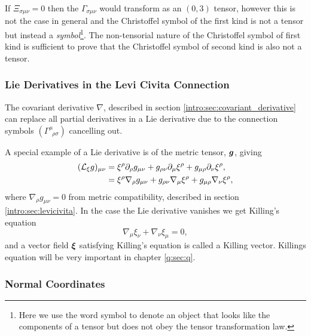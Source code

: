 If $\Xi_{\sigma\mu\nu}=0$ then the $\Gamma_{\sigma\mu\nu}$ would transform as an $(0,3)$ tensor, however this is not the case in general and the Christoffel symbol of the first kind is not a tensor but instead a {\it symbol}\footnote{Here we use the word symbol to denote an object that looks like the components of a tensor but does not obey the tensor transformation law.}. The non-tensorial nature of the Christoffel symbol of first kind is sufficient to prove that the Christoffel symbol of second kind is also not a tensor.


\subsubsection{Lie Derivatives in the Levi Civita Connection}

The covariant derivative $\nabla$, described in section \ref{intro:sec:covariant_derivative} can replace all partial derivatives in a Lie derivative due to the connection symbols $\left( \Gamma^\mu_{\,\,\,\rho\sigma}\right)$ cancelling out.

A special example of a Lie derivative is of the metric tensor, $\boldsymbol{g}$, giving
\begin{align}
(\mathcal{L}_\xi g)_{\mu\nu} &= \xi^\rho \partial_\rho g_{\mu\nu} + g_{\rho\nu}\partial_\mu \xi^\rho + g_{\mu\rho}\partial_\nu \xi^\rho, \\
&= \xi^\rho {\nabla_\rho g_{\mu\nu}} + g_{\rho\nu}\nabla_\mu \xi^\rho  + g_{\mu\rho}\nabla_\nu \xi^\rho, 
\end{align}
where $\nabla_\rho g_{\mu\nu}=0$ from metric compatibility, described in section \ref{intro:sec:levicivita}. In the case the Lie derivative vanishes we get Killing's equation
\begin{equation}
\nabla_{\mu}\xi_\nu + \nabla_\nu \xi_\mu =0,
\end{equation} 
and a vector field $\boldsymbol\xi$ satisfying Killing's equation is called a Killing vector. Killings equation will be very important in chapter \ref{q:sec:q}.

\subsubsection{Normal Coordinates} \label{intro:sec:normal_coords}

